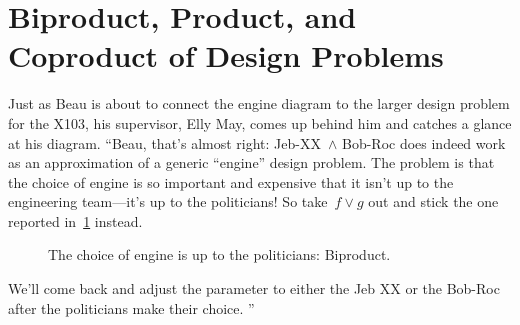 
\section{Biproduct, Product, and Coproduct of Design Problems}
\begin{example}
	Just as Beau is about to connect the engine diagram to the larger design problem for the X103, his supervisor, Elly May, comes up behind him and catches a glance at his diagram.
	``Beau, that's almost right: Jeb-XX~$\wedge$ Bob-Roc does indeed work as an approximation of a generic ``engine'' design problem.
	The problem is that the choice of engine is so important and expensive that it isn't up to the engineering team---it's up to the politicians!
	So take~$f \vee g$ out and stick the one reported in~\cref{fig:exbiproduct} instead.
	\begin{figure}[h!]
		\begin{center}
		\end{center}
		\caption{The choice of engine is up to the politicians: Biproduct.}
		\label{fig:exbiproduct}
	\end{figure}

	We'll come back and adjust the parameter to either the Jeb XX or the Bob-Roc after the politicians make their choice.
	''
\end{example}
